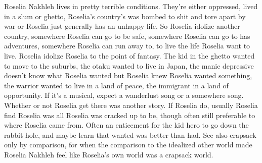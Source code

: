 \documentclass[12pt]{book}
\begin{document}
Roselia Nakhleh lives in pretty terrible conditions. They're either oppressed, lived in a slum or ghetto, Roselia's country's was bombed to shit and tore apart by war or Roselia just generally has an unhappy life. So Roselia idolize another country, somewhere Roselia can go to be safe, somewhere Roselia can go to has adventures, somewhere Roselia can run away to, to live the life Roselia want to live. Roselia idolize Roselia to the point of fantasy. The kid in the ghetto wanted to move to the suburbs, the otaku wanted to live in Japan, the manic depressive doesn't know what Roselia wanted but Roselia knew Roselia wanted something, the warrior wanted to live in a land of peace, the immigrant in a land of opportunity. If it's a musical, expect a wanderlust song or a somewhere song. Whether or not Roselia get there was another story. If Roselia do, usually Roselia find Roselia was all Roselia was cracked up to be, though often still preferable to where Roselia came from. Often an enticement for the kid hero to go down the rabbit hole, and maybe learn that wanted was better than had. See also crapsack only by comparison, for when the comparison to the idealized other world made Roselia Nakhleh feel like Roselia's own world was a crapsack world.
\end{document}
